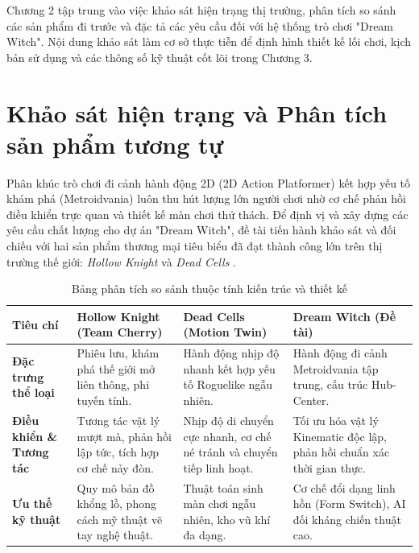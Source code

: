 \documentclass[../DoAn.tex]{subfiles}
\begin{document}
Chương 2 tập trung vào việc khảo sát hiện trạng thị trường, phân tích so sánh các sản phẩm đi trước và đặc tả các yêu cầu đối với hệ thống trò chơi "Dream Witch". Nội dung khảo sát làm cơ sở thực tiễn để định hình thiết kế lối chơi, kịch bản sử dụng và các thông số kỹ thuật cốt lõi trong Chương 3.

\section{Khảo sát hiện trạng và Phân tích sản phẩm tương tự}
\label{section:2.1}

Phân khúc trò chơi đi cảnh hành động 2D (2D Action Platformer) kết hợp yếu tố khám phá (Metroidvania) luôn thu hút lượng lớn người chơi nhờ cơ chế phản hồi điều khiển trực quan và thiết kế màn chơi thử thách. Để định vị và xây dựng các yêu cầu chất lượng cho dự án "Dream Witch", đề tài tiến hành khảo sát và đối chiếu với hai sản phẩm thương mại tiêu biểu đã đạt thành công lớn trên thị trường thế giới: \textit{Hollow Knight} \cite{hollowknightgame} và \textit{Dead Cells} \cite{deadcellsgame}.

\begin{table}[H]
\centering
\caption{Bảng phân tích so sánh thuộc tính kiến trúc và thiết kế}
\label{tab:so_sanh_game}
\begin{tabularx}{\textwidth}{|L|L|L|L|}
\hline
\textbf{Tiêu chí} & \textbf{Hollow Knight} (Team Cherry) & \textbf{Dead Cells} (Motion Twin) & \textbf{Dream Witch} (Đề tài) \\ \hline
\textbf{Đặc trưng thể loại} & Phiêu lưu, khám phá thế giới mở liên thông, phi tuyến tính. & Hành động nhịp độ nhanh kết hợp yếu tố Roguelike ngẫu nhiên. & Hành động đi cảnh Metroidvania tập trung, cấu trúc Hub-Center. \\ \hline
\textbf{Điều khiển \& Tương tác} & Tương tác vật lý mượt mà, phản hồi lập tức, tích hợp cơ chế nảy đòn. & Nhịp độ di chuyển cực nhanh, cơ chế né tránh và chuyển tiếp linh hoạt. & Tối ưu hóa vật lý Kinematic độc lập, phản hồi chuẩn xác thời gian thực. \\ \hline
\textbf{Ưu thế kỹ thuật} & Quy mô bản đồ khổng lồ, phong cách mỹ thuật vẽ tay nghệ thuật. & Thuật toán sinh màn chơi ngẫu nhiên, kho vũ khí đa dạng. & Cơ chế đổi dạng linh hồn (Form Switch), AI đối kháng chiến thuật cao. \\ \hline
\end{tabularx}
\end{table}
\end{document}
